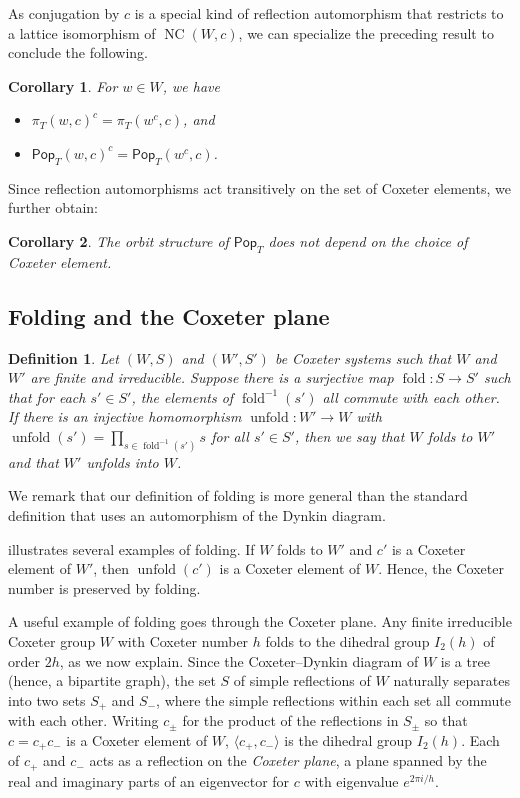 \documentclass[10pt,a4paper]{amsart}
\newtheorem{coro}[coro]{Corollary}
\newtheorem{defi}[defi]{Definition}
\newcommand{\darkblue}{\color{darkblue}}
\newcommand{\defn}[1]{\emph{\darkblue #1}}
\newcommand{\pop}{\mathsf{Pop}}
\newcommand{\U}{{W'}}
\DeclareMathOperator{\NC}{NC}
\DeclareMathOperator{\fold}{fold}
\DeclareMathOperator{\unfold}{unfold}
\begin{document}
As conjugation by $c$ is a special kind of reflection automorphism that restricts to a lattice isomorphism of $\NC(W,c)$, we can specialize the preceding result to conclude the following.

\begin{coro} For $w \in W$, we have
\begin{itemize}
    \item  $\pi_T(w,c)^c = \pi_T(w^c,c)$, and
    \item $\pop_T(w,c)^c = \pop_T(w^c,c)$. 
\end{itemize}
\end{coro}


Since reflection automorphisms act transitively on the set of Coxeter elements, we further obtain:
\begin{coro}
\label{cor:orbit_structure}
The orbit structure of $\pop_T$ does not depend on the choice of Coxeter element.
\end{coro}

\subsection{Folding and the Coxeter plane}
\label{sec:folding}

 


\begin{defi}
Let $(W,S)$ and $(\U,S')$ be Coxeter systems such that $W$ and $W'$ are finite and irreducible. Suppose there is a surjective map $\fold:S\to S'$ such that for each $s'\in S'$, the elements of $\fold^{-1}(s')$ all commute with each other. If there is an injective homomorphism $\unfold:\U\to W$ with $\unfold(s')=\prod_{s\in\fold^{-1}(s')}s$ for all $s'\in S'$, then we say that $W$ \defn{folds} to $W'$ and that $W'$ \defn{unfolds} into $W$. 
\end{defi}

We remark that our definition of folding is more general than the standard definition that uses an automorphism of the Dynkin diagram. 

 illustrates several examples of folding. If $W$ folds to $\U$ and $c'$ is a Coxeter element of $\U$, then $\unfold(c')$ is a Coxeter element of $W$. Hence, the Coxeter number is preserved by folding.


A useful example of folding goes through the Coxeter plane.  Any finite irreducible Coxeter group $W$ with Coxeter number $h$ folds to the dihedral group $I_2(h)$ of order $2h$, as we now explain.  Since the Coxeter--Dynkin diagram of $W$ is a tree (hence, a bipartite graph), the set $S$ of simple reflections of $W$ naturally separates into two sets $S_+$ and $S_-$, where the simple reflections within each set all commute with each other.  Writing $c_\pm$ for the product of the reflections in $S_\pm$ so that $c = c_+ c_-$ is a Coxeter element of $W$, $\langle c_+,c_-\rangle$ is the dihedral group $I_2(h)$.  Each of $c_+$ and $c_-$ acts as a reflection on the \defn{Coxeter plane}, a plane spanned by the real and imaginary parts of an eigenvector for $c$ with eigenvalue $e^{2\pi i/h}$.
\end{document}
